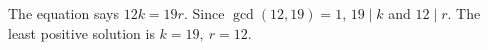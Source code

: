 The equation says $12k=19r$. Since $\gcd(12,19)=1$, $19\mid k$ and $12\mid r$. The least positive solution is $\boxed{k=19,\ r=12}$.
